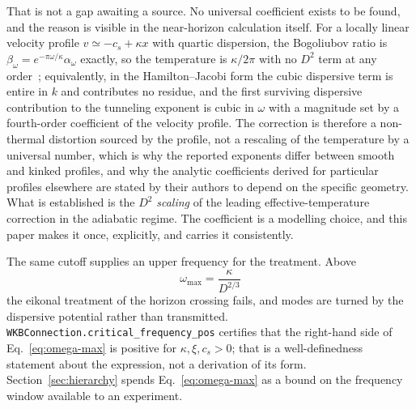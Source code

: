 \documentclass[aps,prd,reprint,nofootinbib,superscriptaddress]{revtex4-2}
\begin{document}
That is not a gap awaiting a source. No universal coefficient exists to be
found, and the reason is visible in the near-horizon calculation itself.
For a locally linear velocity profile $v \simeq -c_s + \kappa x$ with
quartic dispersion, the Bogoliubov ratio is
$\beta_\omega = e^{-\pi\omega/\kappa}\alpha_\omega$ exactly, so the
temperature is $\kappa/2\pi$ with no $D^{2}$ term at any
order~\cite{Coutant2014}; equivalently, in the Hamilton--Jacobi form the
cubic dispersive term is entire in $k$ and contributes no residue, and the
first surviving dispersive contribution to the tunneling exponent is cubic
in $\omega$ with a magnitude set by a fourth-order coefficient of the
velocity profile. The correction is therefore a non-thermal distortion
sourced by the profile, not a rescaling of the temperature by a universal
number, which is why the reported exponents differ between smooth and
kinked profiles, and why the analytic coefficients derived for particular
profiles elsewhere are stated by their authors to depend on the specific
geometry. What is established is the $D^{2}$ \emph{scaling} of the leading
effective-temperature correction in the adiabatic regime. The coefficient
is a modelling choice, and this paper makes it once, explicitly, and
carries it consistently.

The same cutoff supplies an upper frequency for the treatment. Above
\begin{equation}
\label{eq:omega-max}
\omega_{\max} = \frac{\kappa}{D^{2/3}}
\end{equation}
the eikonal treatment of the horizon crossing fails, and modes are turned
by the dispersive potential rather than transmitted.
\texttt{WKBConnection.critical\_frequency\_pos} certifies that the
right-hand side of Eq.~\eqref{eq:omega-max} is positive for
$\kappa,\xi,c_s > 0$; that is a well-definedness statement about the
expression, not a derivation of its form.
Section~\ref{sec:hierarchy} spends Eq.~\eqref{eq:omega-max} as a bound on
the frequency window available to an experiment.
\end{document}
